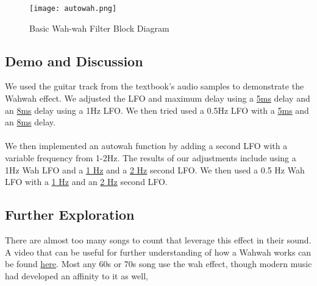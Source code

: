 \begin{figure}[ht]
	\centering
	\texttt{[image: autowah.png]}
	\caption{Basic Wah-wah Filter Block Diagram}
	\label{fig:autowah-block-diagram}
\end{figure}


\subsection{Demo and Discussion}
We used the guitar track from the textbook's audio samples to demonstrate the Wahwah effect. We adjusted the LFO and maximum delay using a
\href{run:../OutputAudio/WahWah_22-004 Original Guitar_{freq=10Hz}{delay_max=5ms}.wav}{5ms}
delay and an
\href{run:../OutputAudio/WahWah_22-004 Original Guitar_{freq=10Hz}{delay_max=8ms}.wav}{8ms}
 delay using a 1Hz LFO. We then tried used a 0.5Hz LFO with a
\href{run:../OutputAudio/WahWah_22-004 Original Guitar_{freq=20Hz}{delay_max=5ms}.wav}{5ms}
and an
\href{run:../OutputAudio/WahWah_22-004 Original Guitar_{freq=20Hz}{delay_max=8ms}.wav}{8ms}
delay.
\\ \\
We then implemented an autowah function by adding a second LFO with a variable frequency from 1-2Hz. The results of our adjustments include using a 1Hz Wah LFO and a
\href{run:../OutputAudio/WahWah_22-004 Original Guitar_{freq=10Hz}{delay_max=5ms}{LOfreq=1Hz}.wav}{1 Hz}
and a
\href{run:../OutputAudio/WahWah_22-004 Original Guitar_{freq=10Hz}{delay_max=5ms}{LOfreq=2Hz}.wav}{2 Hz}
second LFO. We then used a 0.5 Hz Wah LFO with a
\href{run:../OutputAudio/WahWah_22-004 Original Guitar_{freq=20Hz}{delay_max=5ms}{LOfreq=1Hz}.wav}{1 Hz}
and an
\href{run:../OutputAudio/WahWah_22-004 Original Guitar_{freq=20Hz}{delay_max=5ms}{LOfreq=2Hz}.wav}{2 Hz}
second LFO.

\subsection{Further Exploration}
There are almost too many songs to count that leverage this effect in their sound. A video that can be useful for further understanding of how a Wahwah works can be found \href{https://www.youtube.com/watch?v=R87mpsSAHXg}{here}. Most any 60s or 70s song use the wah effect, though modern music had developed an affinity to it as well,
